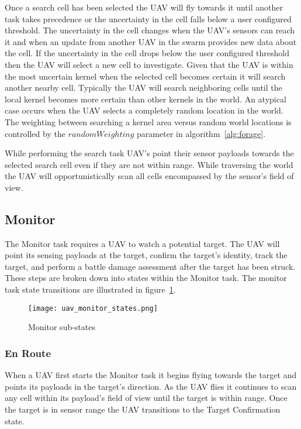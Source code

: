 
Once a search cell has been selected the UAV will fly towards it until another task takes precedence or the uncertainty in the cell falls below a user configured threshold.  The uncertainty in the cell changes when the UAV's sensors can reach it and when an update from another UAV in the swarm provides new data about the cell. If the uncertainty in the cell drops below the user configured threshold then the UAV will select a new cell to investigate.  Given that the UAV is within the most uncertain kernel when the selected cell becomes certain it will search another nearby cell.  Typically the UAV will search neighboring cells until the local kernel becomes more certain than other kernels in the world.  An atypical case occurs when the UAV selects a completely random location in the world.  The weighting between searching a kernel area versus random world locations is controlled by the $randomWeighting$ parameter in algorithm~\ref{alg:forage}.

While performing the search task UAV's point their sensor payloads towards the selected search cell even if they are not within range.  While traversing the world the UAV will opportunistically scan all cells encompassed by the sensor's field of view.


\subsection{Monitor}
The Monitor task requires a UAV to watch a potential target.  The UAV will point its sensing payloads at the target, confirm the target's identity, track the target, and perform a battle damage assessment after the target has been struck.  These steps are broken down into states within the Monitor task.  The monitor task state transitions are illustrated in figure~\ref{fig:monitor}.  

\begin{figure}[p]
	\centering
	\texttt{[image: uav\_monitor\_states.png]}
	\caption{Monitor sub-states}
	\label{fig:monitor}
\end{figure}

\subsubsection{En Route}
When a UAV first starts the Monitor task it begins flying towards the target and points its payloads in the target's direction.  As the UAV flies it continues to scan any cell within its payload's field of view until the target is within range.  Once the target is in sensor range the UAV transitions to the Target Confirmation state.  

